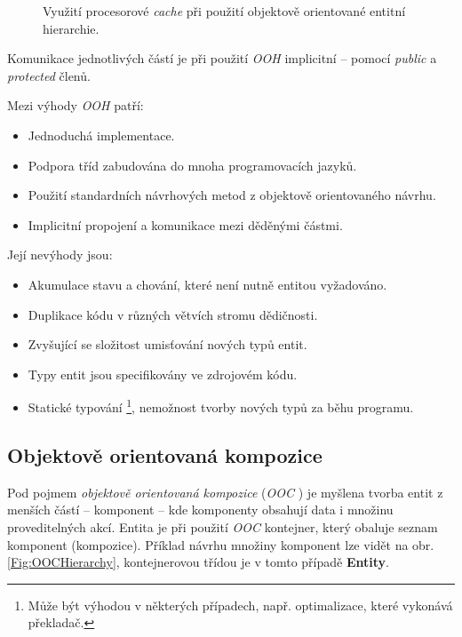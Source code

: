 \begin{figure}
	\caption{Využití procesorové \emph{cache} při použití objektově orientované entitní hierarchie.}
	\label{Fig:OOPCache}
\end{figure}

Komunikace jednotlivých částí je při použití \emph{OOH} implicitní -- pomocí \emph{public} a \emph{protected} členů. 

\pagebreak

\noindent Mezi výhody \emph{OOH} patří: 
\begin{itemize}
	\item Jednoduchá implementace.
	\item Podpora tříd zabudována do mnoha programovacích jazyků.
	\item Použití standardních návrhových metod z objektově orientovaného návrhu.
	\item Implicitní propojení a komunikace mezi děděnými částmi.
\end{itemize}

\noindent Její nevýhody jsou: 
\begin{itemize}
	\item Akumulace stavu a chování, které není nutně entitou vyžadováno.
	\item Duplikace kódu v různých větvích stromu dědičnosti.
	\item Zvyšující se složitost umisťování nových typů entit.
	\item Typy entit jsou specifikovány ve zdrojovém kódu.
	\item Statické typování \footnote{Může být výhodou v některých případech, např. optimalizace, které vykonává překladač.}, nemožnost tvorby nových typů za běhu programu.
\end{itemize}

\subsection{Objektově orientovaná kompozice}

Pod pojmem \emph{objektově orientovaná kompozice} (\emph{OOC} \cite{GameDesignPatterns}) je myšlena tvorba entit z menších částí -- komponent -- kde komponenty obsahují data i množinu proveditelných akcí. Entita je při použití \emph{OOC} kontejner, který obaluje seznam komponent (kompozice). Příklad návrhu množiny komponent lze vidět na obr. \ref{Fig:OOCHierarchy}, kontejnerovou třídou je v tomto případě \textbf{Entity}.

